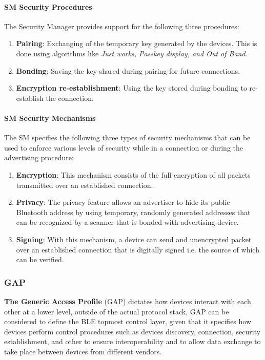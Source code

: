 \paragraph{SM Security Procedures}
The Security Manager provides support for the following three procedures:
\begin{enumerate}
	\item \textbf{Pairing}: Exchanging of the temporary key generated by the devices. This is done using algorithms like \textit{Just works, Passkey display, and Out of Band.}
	\item \textbf{Bonding}: Saving the key shared during pairing for future connections.
	\item \textbf{Encryption re-establishment}: Using the key stored during bonding to re-establish the connection.
\end{enumerate}
\paragraph{SM Security Mechanisms}
The SM specifies the following three types of security mechanisms that can be used to enforce various levels of security while in a connection or during the advertising procedure:
\begin{enumerate}
	\item \textbf{Encryption}: This mechanism consists of the full encryption of all packets transmitted over an established connection.
	\item \textbf{Privacy}: The privacy feature allows an advertiser to hide its public Bluetooth address by using temporary, randomly generated addresses that can be recognized by a scanner that is bonded with advertising device.
	\item \textbf{Signing}: With this mechanism, a device can send and unencrypted packet over an established connection that is digitally signed i.e. the source of which can be verified.
\end{enumerate}
\subsubsection{GAP}
\textbf{The Generic Access Profile} (GAP) dictates how devices interact with each other at a lower level, outside of the actual protocol stack, GAP can be considered to define the BLE topmost control layer, given that it specifies how devices perform control procedures such as devices discovery, connection, security establishment, and other to ensure interoperability and to allow data exchange to take place between devices from different vendors.
